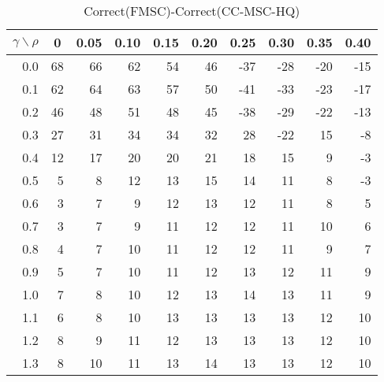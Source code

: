 \documentclass[12pt]{article}
\begin{document}
%
\begin{table}[!tbp]
\caption{Correct(FMSC)-Correct(CC-MSC-HQ)}
 \begin{center}
 \begin{tabular}{r|rrrrrrrrr}\hline\hline
\multicolumn{1}{c|}{$\gamma\backslash\rho$}&\multicolumn{1}{c}{0}&\multicolumn{1}{c}{0.05}&\multicolumn{1}{c}{0.10}&\multicolumn{1}{c}{0.15}&\multicolumn{1}{c}{0.20}&\multicolumn{1}{c}{0.25}&\multicolumn{1}{c}{0.30}&\multicolumn{1}{c}{0.35}&\multicolumn{1}{c}{0.40}\tabularnewline
\hline
0.0&68&66&62&54&46&-37&-28&-20&-15\tabularnewline
0.1&62&64&63&57&50&-41&-33&-23&-17\tabularnewline
0.2&46&48&51&48&45&-38&-29&-22&-13\tabularnewline
0.3&27&31&34&34&32& 28&-22& 15& -8\tabularnewline
0.4&12&17&20&20&21& 18& 15&  9& -3\tabularnewline
0.5& 5& 8&12&13&15& 14& 11&  8& -3\tabularnewline
0.6& 3& 7& 9&12&13& 12& 11&  8&  5\tabularnewline
0.7& 3& 7& 9&11&12& 12& 11& 10&  6\tabularnewline
0.8& 4& 7&10&11&12& 12& 11&  9&  7\tabularnewline
0.9& 5& 7&10&11&12& 13& 12& 11&  9\tabularnewline
1.0& 7& 8&10&12&13& 14& 13& 11&  9\tabularnewline
1.1& 6& 8&10&13&13& 13& 13& 12& 10\tabularnewline
1.2& 8& 9&11&12&13& 13& 13& 12& 10\tabularnewline
1.3& 8&10&11&13&14& 13& 13& 12& 10\tabularnewline
\hline
\end{tabular}

\end{center}

\end{table}
\end{document}

